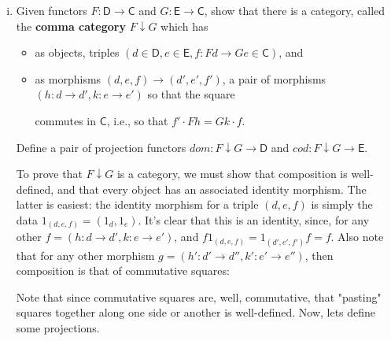 \documentclass[10pt, oneside]{article}   	%
\newcommand{\cat}[1]{\bm{ \mathsf{#1} }}
\newcommand{\cc}{\cat{C}}
\newcommand{\dd}{\cat{D}}
\newcommand{\ee}{\cat{E}}
\begin{document}
\begin{enumerate}[(i)]
\item Given functors $ F : \dd \to \cc$ and $G : \ee \to \cc$, show that there is a category, called the \textbf{comma category} $F \downarrow G$ which has 

\begin{itemize}
\item as objects, triples $(d \in \dd, e \in \ee, f : Fd \to Ge \in \cc)$, and 
\item as morphisms $(d, e, f) \to (d', e', f')$, a pair of morphisms $(h : d \to d', k: e \to e')$ so that the square 

\begin{center}
\end{center}

commutes in $\cc$, i.e., so that $f' \cdot Fh = Gk \cdot f$. 
\end{itemize}

Define a pair of projection functors $dom : F \downarrow G \to \dd$ and $cod : F \downarrow G \to \ee$. 


To prove that $F \downarrow G$ is a category, we must show that composition is well-defined, and that every object has an associated identity morphism. The latter is easiest: the identity morphism for a triple $(d, e, f)$ is simply the data $1_{(d,e,f)} = (1_d, 1_e)$. It's clear that this is an identity, since, for any other $f = (h : d \to d', k: e \to e')$, and $f1_{(d,e,f)} = 1_{(d',e',f')}f = f$. Also note that for any other morphism $g = (h': d' \to d'', k' : e' \to e'')$, then composition is that of commutative squares: 

\begin{center}
\end{center}

Note that since commutative squares are, well, commutative, that "pasting" squares together along one side or another is well-defined. Now, lets define some projections. 


\end{enumerate}
\end{document}
